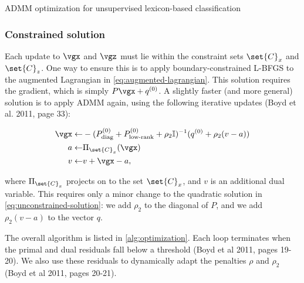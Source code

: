 \begin{algorithm}[t!]
\begin{algorithmic}
\EndWhile
{}
\EndWhile
{}
\EndWhile
\end{algorithmic}
\caption{ADMM optimization for unsupervised lexicon-based classification}
\label{alg:optimization}
\end{algorithm}

\subsubsection{Constrained solution}
Each update to $\vgx$ and $\vgz$ must lie within the constraint sets $\set{C}_x$ and $\set{C}_z$. One way to ensure this is to apply boundary-constrained L-BFGS to the augmented Lagrangian in \autoref{eq:augmented-lagrangian}. This solution requires the gradient, which is simply $P \vgx + \qx$. A slightly faster (and more general) solution is to apply ADMM again, using the following iterative updates (Boyd et al. 2011, page 33):
\begin{small}
\begin{align}
\vgx \gets & -(\Px_{\text{diag}} + \Px_{\text{low-rank}} + \rho_2 \mathbb{I})^{-1} (\qx + \rho_2(v-a))\\
a \gets & \Pi_{\set{C}_x}(\vgx)\\
v \gets & v + \vgx - a,
\end{align}
\end{small}
where $\Pi_{\set{C}_x}$ projects on to the set $\set{C}_x$, and $v$ is an additional dual variable. This requires only a minor change to the quadratic solution in \autoref{eq:unconstrained-solution}: we add $\rho_2$ to the diagonal of $P$, and we add $\rho_2 (v - a)$ to the vector $q$. 

The overall algorithm is listed in \autoref{alg:optimization}. Each loop terminates when the primal and dual residuals fall below a threshold (Boyd et al 2011, pages 19-20). We also use these residuals to dynamically adapt the penalties $\rho$ and $\rho_2$ (Boyd et al 2011, pages 20-21).
